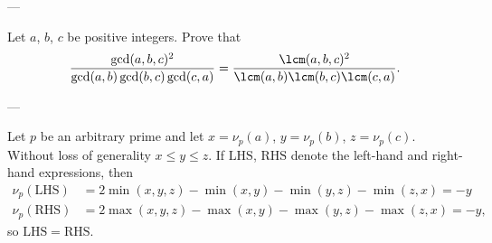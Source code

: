 
---

Let $a$, $b$, $c$ be positive integers. Prove that \[\frac{\gcd(a,b,c)^2}{\gcd(a,b)\gcd(b,c)\gcd(c,a)}=\frac{\lcm(a,b,c)^2}{\lcm(a,b)\lcm(b,c)\lcm(c,a)}.\]

---

Let $p$ be an arbitrary prime and let $x=\nu_p(a)$, $y=\nu_p(b)$, $z=\nu_p(c)$. Without loss of generality $x\le y\le z$. If $\mathrm{LHS}$, $\mathrm{RHS}$ denote the left-hand and right-hand expressions, then
\begin{align*}
    \nu_p(\mathrm{LHS})&=2\min(x,y,z)-\min(x,y)-\min(y,z)-\min(z,x)=-y\\
    \nu_p(\mathrm{RHS})&=2\max(x,y,z)-\max(x,y)-\max(y,z)-\max(z,x)=-y,
\end{align*}
so $\mathrm{LHS}=\mathrm{RHS}$.

